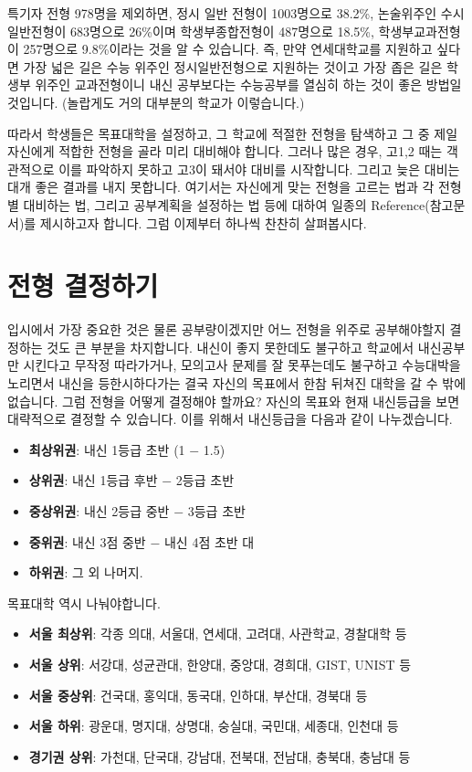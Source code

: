 \documentclass[final]{IEEEphot}
\begin{document}
특기자 전형 978명을 제외하면, 정시 일반 전형이 1003명으로 38.2\%, 논술위주인 수시일반전형이 683명으로 26\%이며 학생부종합전형이 487명으로 18.5\%, 학생부교과전형이
257명으로 9.8\%이라는 것을 알 수 있습니다. 즉, 만약 연세대학교를 지원하고 싶다면 가장 넓은 길은 수능 위주인 정시일반전형으로 지원하는 것이고 가장 좁은 길은 학생부 위주인 교과전형이니
내신 공부보다는 수능공부를 열심히 하는 것이 좋은 방법일 것입니다. (놀랍게도 거의 대부분의 학교가 이렇습니다.)


\pagebreak


따라서 학생들은 목표대학을 설정하고, 그 학교에 적절한 전형을 탐색하고 그 중 제일 자신에게 적합한 전형을 골라 미리 대비해야 합니다. 그러나 많은 경우, 고1,2 때는 객관적으로 이를 파악하지 못하고
고3이 돼서야 대비를 시작합니다. 그리고 늦은 대비는 대개 좋은 결과를 내지 못합니다. 여기서는 자신에게 맞는 전형을 고르는 법과 각 전형별 대비하는 법, 그리고 공부계획을 설정하는 법 등에 대하여 일종의
Reference(참고문서)를 제시하고자 합니다. 그럼 이제부터 하나씩 찬찬히 살펴봅시다.

\section{전형 결정하기}

\hspace{0.3cm} 입시에서 가장 중요한 것은 물론 공부량이겠지만 어느 전형을 위주로 공부해야할지 결정하는 것도 큰 부분을 차지합니다. 내신이 좋지 못한데도 불구하고 학교에서 내신공부만 시킨다고 무작정
따라가거나, 모의고사 문제를 잘 못푸는데도 불구하고 수능대박을 노리면서 내신을 등한시하다가는 결국 자신의 목표에서 한참 뒤쳐진 대학을 갈 수 밖에 없습니다. 
그럼 전형을 어떻게 결정해야 할까요? 자신의 목표와 현재 내신등급을 보면 대략적으로 결정할 수 있습니다. 이를 위해서 내신등급을 다음과 같이 나누겠습니다.

\begin{itemize}
 \item \textbf{최상위권}: 내신 1등급 초반 (1 $-$ 1.5)
 \item \textbf{상위권}: 내신 1등급 후반 $-$ 2등급 초반
 \item \textbf{중상위권}: 내신 2등급 중반 $-$ 3등급 초반
 \item \textbf{중위권}: 내신 3점 중반 $-$ 내신 4점 초반 대
 \item \textbf{하위권}: 그 외 나머지.
\end{itemize}

목표대학 역시 나눠야합니다.

\begin{itemize}
 \item \textbf{서울 최상위}: 각종 의대, 서울대, 연세대, 고려대, 사관학교, 경찰대학 등
 \item \textbf{서울 상위}: 서강대, 성균관대, 한양대, 중앙대, 경희대, GIST, UNIST 등
 \item \textbf{서울 중상위}: 건국대, 홍익대, 동국대, 인하대, 부산대, 경북대 등
 \item \textbf{서울 하위}: 광운대, 명지대, 상명대, 숭실대, 국민대, 세종대, 인천대 등
 \item \textbf{경기권 상위}: 가천대, 단국대, 강남대, 전북대, 전남대, 충북대, 충남대 등
\end{itemize}
\end{document}
